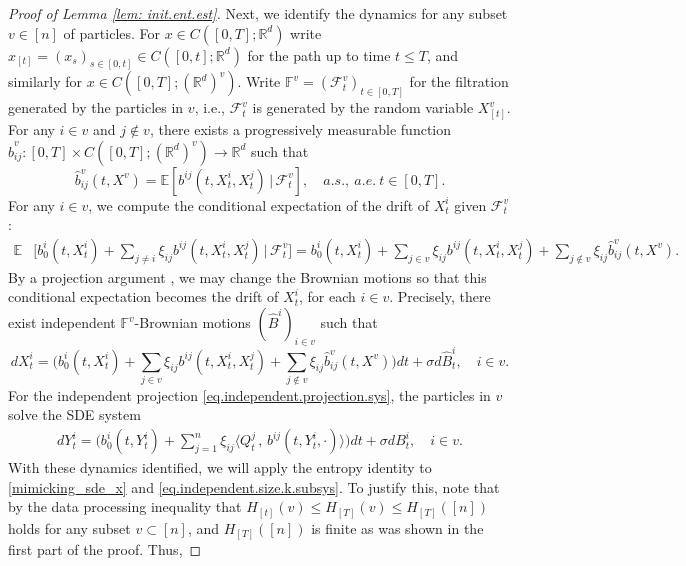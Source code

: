 \documentclass[11pt,reqno]{amsart}
\numberwithin{equation}{section}
\theoremstyle{definition}
\def\E{{\mathbb E}}
\def\F{{\mathcal F}}
\def\FF{{\mathbb F}}
\def\R{{\mathbb R}}
\begin{document}
\begin{proof}[Proof of Lemma \ref{lem: init.ent.est}]
		Next, we identify the dynamics for any subset $v \in [n]$ of particles. For $x \in C([0,T];\R^d)$ write $x_{[t]}=(x_s)_{s \in [0,t]} \in C([0,t];\R^d)$ for the path up to time $t \le T$, and similarly for $x \in C([0,T];(\R^d)^v)$.
		Write $\FF^v=(\F^v_t)_{t \in [0,T]}$ for the filtration generated by the particles in $v$, i.e., $\F^v_t$ is generated by the random variable $X^v_{[t]}$.
		For any $i \in v$ and $j \notin v $, there exists a progressively measurable function $ \widehat{b}^v_{ij} : [0, T] \times  C([0,T];(\R^d)^v)\to \R^d $ such that
		\begin{equation}
			\widehat{b}^v_{ij} (t, X^v) = \E[b^{ij}(t, X^i_t, X^j_t) \, | \, \F^v_t], \quad a.s., \ a.e. \  t \in [0,T].  \label{pf:bhat-hierarchy}
		\end{equation}
		For any $ i \in v $, we compute the conditional expectation of the drift of $X^i_t$ given $\F^v_t$:
		\begin{align*}
			\E &\Big[b_0^{i}(t, X^i_t) +  \sum_{j \neq i} \xi_{ij} b^{ij}(t, X^i_t, X^j_t) \,\Big|\, \F^v_t\Big] = b_0^{i} (t,  X^i_t ) + \sum_{j \in v}\xi_{ij} b^{ij}(t, X^i_t ,  X^j_t ) +\sum_{j \notin v} \xi_{ij} 	\widehat{b}^v_{ij} (t, X^v ).
		\end{align*}
By a projection argument \cite[Lemma 4.1]{lacker2022hierarchies}, we may change the Brownian motions so that  this conditional expectation becomes the drift of $X^i_t$, for each $i \in v$. Precisely,  there exist independent $\FF^v$-Brownian motions $(\widehat{B}^i)_{i \in v}$ such that 
\begin{equation} \label{mimicking_sde_x}
d X^{i}_t = \Big(b_0^{i}(t, X^i_t) +  \sum_{ j \in v} \xi_{ij} b^{ij}(t, X^i_t, X^j_t) + \sum_{j \notin v} \xi_{ij} 	\widehat{b}^v_{ij} (t, X^v )\Big) dt + \sigma d \widehat{B}^i_t, \quad i \in v.
\end{equation}
For the independent projection \eqref{eq.independent.projection.sys}, the particles in $ v $ solve the SDE system
		 \begin{align} \label{eq.independent.size.k.subsys}
	 		d Y^{i}_t = \Big(b_0^{i}(t, Y^{i}_t) + \sum_{j =1}^n \xi_{ij} \big\langle Q^{j}_t\, ,\, b^{ij}(t, Y^{i}_t, \cdot) \big\rangle \Big)dt + \sigma dB^i_t, \quad i \in v.
		 \end{align}
With these dynamics identified, we will apply the entropy identity \cite[Lemma 4.4 (ii)]{lacker2022hierarchies} to  \eqref{mimicking_sde_x} and \eqref{eq.independent.size.k.subsys}. To justify this, note that by the data processing inequality that $H_{[t]}(v) \leq H_{[T]}(v) \leq H_{[T]}([n])$ holds for any subset $v\subset [n]$, and $H_{[T]}([n])$ is finite as was shown in the first part of the proof.  Thus,

\end{proof}
\end{document}
